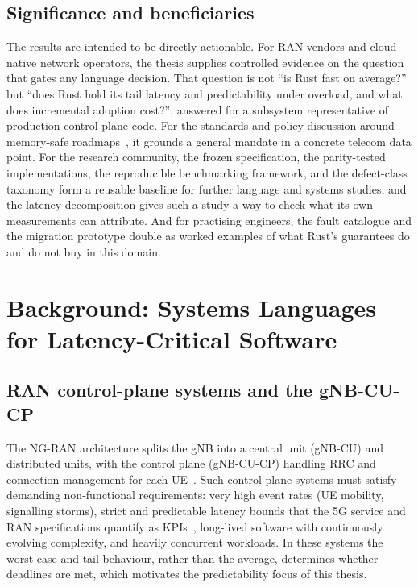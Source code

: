 \documentclass[english,oneside,a4paper,censored,csm,software-track-2020]{HYthesisML}
\begin{document}
\section{Significance and beneficiaries}
The results are intended to be directly actionable. For RAN vendors and cloud-native network
operators, the thesis supplies controlled evidence on the question that gates any language
decision. That question is not ``is Rust fast on average?'' but ``does Rust hold its tail latency and
predictability under overload, and what does incremental adoption cost?'', answered for a subsystem
representative of production control-plane code. For the standards and policy discussion around
memory-safe roadmaps~\cite{cisa2023memorysafe,oncd2024building}, it grounds a general mandate in
a concrete telecom data point. For the research community, the frozen specification, the
parity-tested implementations, the reproducible benchmarking framework, and the defect-class
taxonomy form a reusable baseline for further language and systems studies, and the latency
decomposition gives such a study a way to check what its own measurements can attribute. And for practising
engineers, the fault catalogue and the migration prototype double as worked examples of what
Rust's guarantees do and do not buy in this domain.

\chapter{Background: Systems Languages for Latency-Critical Software\label{chapter:background}}

\section{RAN control-plane systems and the gNB-CU-CP}\label{sec:ranarch}
The NG-RAN architecture splits the gNB into a central unit (gNB-CU) and distributed units,
with the control plane (gNB-CU-CP) handling RRC and connection management for each
UE~\cite{3gpp38401,3gpp38300,3gpp38331}. Such control-plane systems must satisfy demanding
non-functional requirements: very high event rates (UE mobility, signalling storms), strict
and predictable latency bounds that the 5G service and RAN specifications quantify as
KPIs~\cite{3gpp38913,3gpp22261}, long-lived software with continuously evolving complexity,
and heavily concurrent workloads. In these systems the worst-case and tail behaviour,
rather than the average, determines whether deadlines are met, which motivates the
predictability focus of this thesis.
\end{document}
